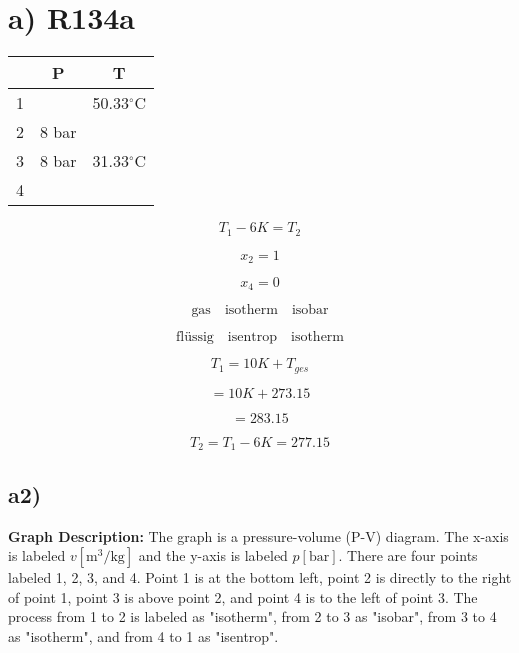 

\section*{a) R134a}

\begin{tabular}{|c|c|c|}
\hline
 & P & T \\
\hline
1 & & 50.33$^\circ$C \\
\hline
2 & 8 bar & \\
\hline
3 & 8 bar & 31.33$^\circ$C \\
\hline
4 & & \\
\hline
\end{tabular}

\[
T_1 - 6K = T_2
\]

\[
x_2 = 1
\]

\[
x_4 = 0
\]

\[
\text{gas} \quad \text{isotherm} \quad \text{isobar}
\]

\[
\text{flüssig} \quad \text{isentrop} \quad \text{isotherm}
\]

\[
T_1 = 10K + T_{ges}
\]

\[
= 10K + 273.15
\]

\[
= 283.15
\]

\[
T_2 = T_1 - 6K = 277.15
\]

\subsection*{a2)}

\textbf{Graph Description:} The graph is a pressure-volume (P-V) diagram. The x-axis is labeled $v [\text{m}^3/\text{kg}]$ and the y-axis is labeled $p [\text{bar}]$. There are four points labeled 1, 2, 3, and 4. Point 1 is at the bottom left, point 2 is directly to the right of point 1, point 3 is above point 2, and point 4 is to the left of point 3. The process from 1 to 2 is labeled as "isotherm", from 2 to 3 as "isobar", from 3 to 4 as "isotherm", and from 4 to 1 as "isentrop".